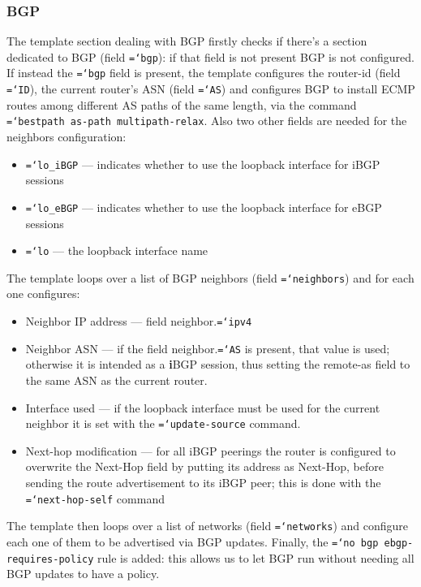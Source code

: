 \documentclass{report}
\newcommand{\monospaced}[1]{\texttt{\hyphenchar\font=`\-#1}}
\begin{document}
\subsubsection{BGP}\label{sec:template_frr_bgp}
The template section dealing with BGP firstly checks if there's a section dedicated to BGP (field \monospaced{bgp}): if that field is not present BGP is not configured.\newline
If instead the \monospaced{bgp} field is present, the template configures the router-id (field \monospaced{ID}), the current router's ASN (field \monospaced{AS}) and configures BGP to install ECMP routes among different AS paths of the same length, via the command \monospaced{bestpath as-path multipath-relax}.
Also two other fields are needed for the neighbors configuration:
\begin{itemize}
    \item \monospaced{lo\_iBGP} --- indicates whether to use the loopback interface for iBGP sessions
    \item \monospaced{lo\_eBGP} --- indicates whether to use the loopback interface for eBGP sessions
    \item \monospaced{lo} --- the loopback interface name
\end{itemize}
The template loops over a list of BGP neighbors (field \monospaced{neighbors}) and for each one configures:
\begin{itemize}
    \item Neighbor IP address --- field neighbor.\monospaced{ipv4}
    \item Neighbor ASN --- if the field neighbor.\monospaced{AS} is present, that value is used; otherwise it is intended as a \textbf{i}BGP session, thus setting the remote-as field to the same ASN as the current router.
    \item Interface used --- if the loopback interface must be used for the current neighbor it is set with the \monospaced{update-source} command.
    \item Next-hop modification --- for all iBGP peerings the router is configured to overwrite the Next-Hop field by putting its address as Next-Hop, before sending the route advertisement to its iBGP peer; this is done with the \monospaced{next-hop-self} command
\end{itemize}
The template then loops over a list of networks (field \monospaced{networks}) and configure each one of them to be advertised via BGP updates. Finally, the \monospaced{no bgp ebgp-requires-policy} rule is added: this allows us to let BGP run without needing all BGP updates to have a policy.
\end{document}
